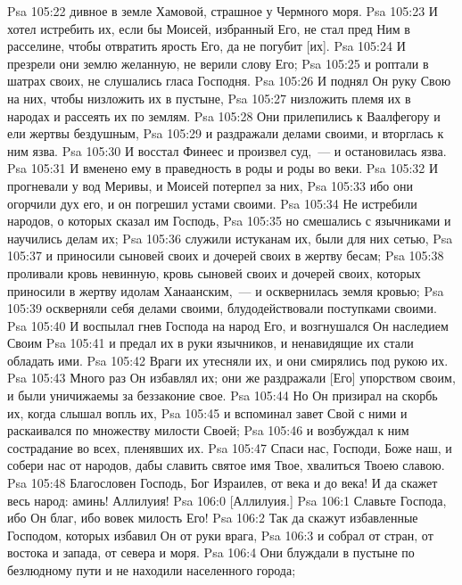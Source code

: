\vs Psa 105:22 дивное в земле Хамовой, страшное у Чермного моря.
\vs Psa 105:23 И хотел истребить их, если бы Моисей, избранный Его, не стал пред Ним в расселине, чтобы отвратить ярость Его, да не погубит [их].
\vs Psa 105:24 И презрели они землю желанную, не верили слову Его;
\vs Psa 105:25 и роптали в шатрах своих, не слушались гласа Господня.
\vs Psa 105:26 И поднял Он руку Свою на них, чтобы низложить их в пустыне,
\vs Psa 105:27 низложить племя их в народах и рассеять их по землям.
\vs Psa 105:28 Они прилепились к Ваалфегору и ели жертвы бездушным,
\vs Psa 105:29 и раздражали  делами своими, и вторглась к ним язва.
\vs Psa 105:30 И восстал Финеес и произвел суд,~--- и остановилась язва.
\vs Psa 105:31 И  вменено ему в праведность в роды и роды во веки.
\vs Psa 105:32 И прогневали  у вод Меривы, и Моисей потерпел за них,
\vs Psa 105:33 ибо они огорчили дух его, и он погрешил устами своими.
\vs Psa 105:34 Не истребили народов, о которых сказал им Господь,
\vs Psa 105:35 но смешались с язычниками и научились делам их;
\vs Psa 105:36 служили истуканам их,  были для них сетью,
\vs Psa 105:37 и приносили сыновей своих и дочерей своих в жертву бесам;
\vs Psa 105:38 проливали кровь невинную, кровь сыновей своих и дочерей своих, которых приносили в жертву идолам Ханаанским,~--- и осквернилась земля кровью;
\vs Psa 105:39 оскверняли себя делами своими, блудодействовали поступками своими.
\vs Psa 105:40 И воспылал гнев Господа на народ Его, и возгнушался Он наследием Своим
\vs Psa 105:41 и предал их в руки язычников, и ненавидящие их стали обладать ими.
\vs Psa 105:42 Враги их утесняли их, и они смирялись под рукою их.
\vs Psa 105:43 Много раз Он избавлял их; они же раздражали [Его] упорством своим, и были уничижаемы за беззаконие свое.
\vs Psa 105:44 Но Он призирал на скорбь их, когда слышал вопль их,
\vs Psa 105:45 и вспоминал завет Свой с ними и раскаивался по множеству милости Своей;
\vs Psa 105:46 и возбуждал к ним сострадание во всех, пленявших их.
\vs Psa 105:47 Спаси нас, Господи, Боже наш, и собери нас от народов, дабы славить святое имя Твое, хвалиться Твоею славою.
\vs Psa 105:48 Благословен Господь, Бог Израилев, от века и до века! И да скажет весь народ: аминь! Аллилуия!
\vs Psa 106:0 [Аллилуия.]
\rsbpar\vs Psa 106:1 Славьте Господа, ибо Он благ, ибо вовек милость Его!
\vs Psa 106:2 Так да скажут избавленные Господом, которых избавил Он от руки врага,
\vs Psa 106:3 и собрал от стран, от востока и запада, от севера и моря.
\vs Psa 106:4 Они блуждали в пустыне по безлюдному пути и не находили населенного города;
